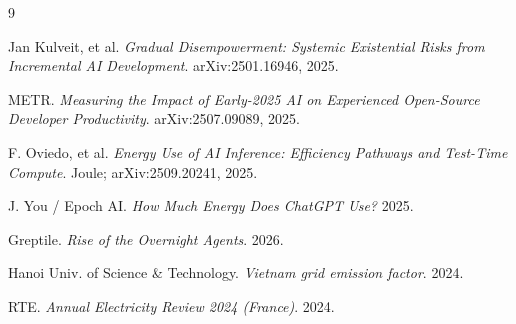 \documentclass[11pt,a4paper]{article}
\begin{document}

\begin{thebibliography}{9}

Jan Kulveit, et al.
\textit{Gradual Disempowerment: Systemic Existential Risks from Incremental AI Development}.
arXiv:2501.16946, 2025.

METR.
\textit{Measuring the Impact of Early-2025 AI on Experienced Open-Source Developer Productivity}.
arXiv:2507.09089, 2025.

F. Oviedo, et al.
\textit{Energy Use of AI Inference: Efficiency Pathways and Test-Time Compute}.
Joule; arXiv:2509.20241, 2025.

J. You / Epoch AI.
\textit{How Much Energy Does ChatGPT Use?}
2025.

Greptile.
\textit{Rise of the Overnight Agents}.
2026.

Hanoi Univ. of Science \& Technology.
\textit{Vietnam grid emission factor}.
2024.

RTE.
\textit{Annual Electricity Review 2024 (France)}.
2024.

\end{thebibliography}
\end{document}
